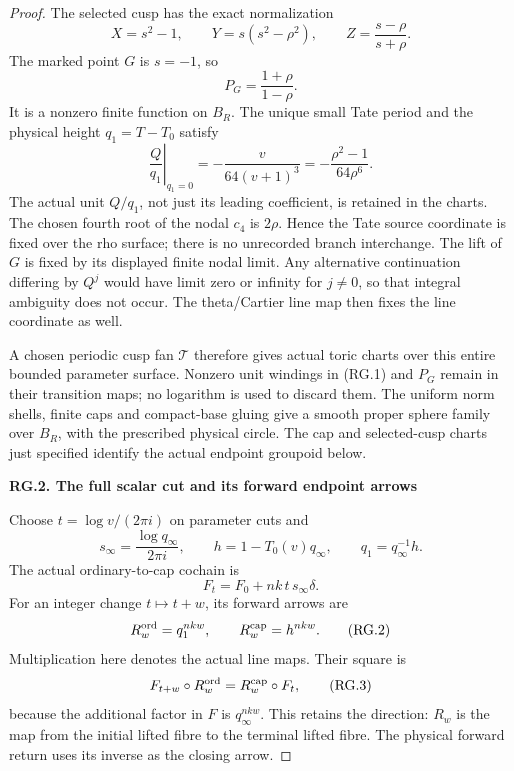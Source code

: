 \begin{proof}
The selected cusp has the exact normalization
\[
 X=s^2-1,\qquad Y=s(s^2-\rho^2),\qquad
 Z=\frac{s-\rho}{s+\rho}.
\]
The marked point \(G\) is \(s=-1\), so
\[
 P_G=\frac{1+\rho}{1-\rho}.
\]
It is a nonzero finite function on \(B_R\). The unique small
Tate period and the physical height \(q_1=T-T_0\) satisfy
\[
 \left.\frac{Q}{q_1}\right|_{q_1=0}
       =-\frac{v}{64(v+1)^3}
       =-\frac{\rho^2-1}{64\rho^6}.                 \tag{RG.1}
\]
The actual unit \(Q/q_1\), not just its leading coefficient, is
retained in the charts. The chosen fourth root of the nodal
\(c_4\) is \(2\rho\). Hence the Tate source coordinate is fixed
over the rho surface; there is no unrecorded branch interchange.
The lift of \(G\) is fixed by its displayed finite nodal limit.
Any alternative continuation differing by \(Q^j\) would have
limit zero or infinity for \(j\ne0\), so that integral ambiguity
does not occur. The theta/Cartier line map then fixes the line
coordinate as well.

A chosen periodic cusp fan \(\mathcal T\) therefore gives actual
toric charts over this entire bounded parameter surface.
Nonzero unit windings in (RG.1) and \(P_G\) remain in their
transition maps; no logarithm is used to discard them.
The uniform norm shells, finite caps and compact-base gluing
give a smooth proper sphere family over \(B_R\), with the
prescribed physical circle. The cap and selected-cusp charts
just specified identify the actual endpoint groupoid below.

\par

\medskip\noindent\textbf{RG.2. The full scalar cut and its forward endpoint arrows}

\par\nobreak

Choose \(t=\log v/(2\pi i)\) on parameter cuts and
\[
 s_\infty=\frac{\log q_\infty}{2\pi i},\qquad
 h=1-T_0(v)q_\infty,\qquad q_1=q_\infty^{-1}h.
\]
The actual ordinary-to-cap cochain is
\[
 F_t=F_0+nk\,t\,s_\infty\delta.
\]
For an integer change \(t\mapsto t+w\), its forward arrows are
\[
 R^{\rm ord}_w=q_1^{nkw},\qquad
 R^{\rm cap}_w=h^{nkw}.                              \tag{RG.2}
\]
Multiplication here denotes the actual line maps. Their square is
\[
 F_{t+w}\circ R^{\rm ord}_w
        =R^{\rm cap}_w\circ F_t,                     \tag{RG.3}
\]
because the additional factor in \(F\) is \(q_\infty^{nkw}\).
This retains the direction: \(R_w\) is the map from the initial
lifted fibre to the terminal lifted fibre. The physical forward
return uses its inverse as the closing arrow.


\end{proof}
